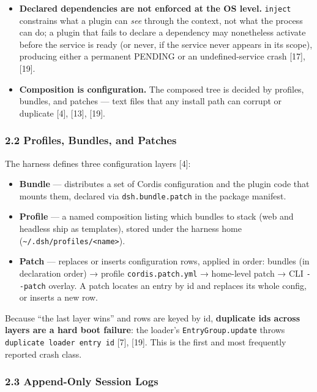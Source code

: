 \documentclass[
]{article}
\newcounter{none} %
\providecommand{\tightlist}{%
  \setlength{\itemsep}{0pt}\setlength{\parskip}{0pt}}
\begin{document}
\begin{itemize}
\item
  \textbf{Declared dependencies are not enforced at the OS level.}
  \texttt{inject} constrains what a plugin can \emph{see} through the
  context, not what the process can do; a plugin that fails to declare a
  dependency may nonetheless activate before the service is ready (or
  never, if the service never appears in its scope), producing either a
  permanent PENDING or an undefined-service crash {[}17{]}, {[}19{]}.
\item
  \textbf{Composition is configuration.} The composed tree is decided by
  profiles, bundles, and patches --- text files that any install path
  can corrupt or duplicate {[}4{]}, {[}13{]}, {[}19{]}.
\end{itemize}

\subsubsection{2.2 Profiles, Bundles, and
Patches}\label{profiles-bundles-and-patches}

The harness defines three configuration layers {[}4{]}:

\begin{itemize}
\tightlist
\item
  \textbf{Bundle} --- distributes a set of Cordis configuration and the
  plugin code that mounts them, declared via \texttt{dsh.bundle.patch}
  in the package manifest.
\item
  \textbf{Profile} --- a named composition listing which bundles to
  stack (web and headless ship as templates), stored under the harness
  home
  (\texttt{\textasciitilde{}/.dsh/profiles/\textless{}name\textgreater{}}).
\item
  \textbf{Patch} --- replaces or inserts configuration rows, applied in
  order: bundles (in declaration order) → profile
  \texttt{cordis.patch.yml} → home-level patch → CLI \texttt{-\/-patch}
  overlay. A patch locates an entry by id and replaces its whole config,
  or inserts a new row.
\end{itemize}

Because ``the last layer wins'' and rows are keyed by id,
\textbf{duplicate ids across layers are a hard boot failure}: the
loader's \texttt{EntryGroup.update} throws
\texttt{duplicate\ loader\ entry\ id} {[}7{]}, {[}19{]}. This is the
first and most frequently reported crash class.

\subsubsection{2.3 Append-Only Session
Logs}\label{append-only-session-logs}
\end{document}
